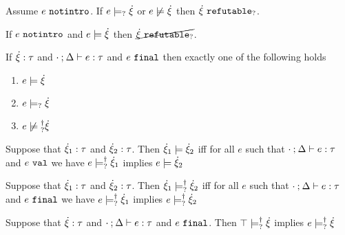 

\begin{lemma}
  \label{lem:notintro-maysat-or-notsat-refutable}
  Assume $e ~\mathtt{notintro}$. If $e \models_{?} \dot{\xi}$ or $\cnotsatisfy{e}{\hxi}$ then $\dot{\xi} ~\mathtt{refutable}_?$.
\end{lemma}

\begin{lemma}
\label{lem:satisfy-not-refutable}
If $e ~\mathtt{notintro}$ and $e \models \dot{\xi}$ then $\cancel{\dot{\xi} ~\mathtt{refutable}_?}$.
\end{lemma}

\begin{theorem}
  \label{thrm:exclusive-constraint-satisfaction}
  If $\dot{\xi} : \tau$ and $\cdot \mathbin{;} \Delta \vdash e : \tau$ and $e ~\mathtt{final}$ then exactly one of the following holds
  \begin{enumerate}
    \item $e \models \dot{\xi}$
    \item $e \models_{?} \dot{\xi}$
    \item $\cnotsatisfyormay{e}{\hxi}$
  \end{enumerate}
\end{theorem}

\begin{definition}
  \label{defn:const-entailment}
  Suppose that $\dot{\xi}_1 : \tau$ and $\dot{\xi}_2 : \tau$.
  Then $\dot{\xi}_1 \models \dot{\xi}_2$ iff for all $e$ such that $\cdot \mathbin{;} \Delta \vdash e : \tau$ and $e ~\mathtt{val}$ we have $e \models_{?}^{\dag} \dot{\xi}_1$ implies $e \models \dot{\xi}_2$
\end{definition}

\begin{definition}
  \label{defn:nn-entailment}
  Suppose that $\dot{\xi}_1 : \tau$ and $\dot{\xi}_2 : \tau$. Then $\dot{\xi}_1 \models_{?}^{\dag} \dot{\xi}_2$ iff for all $e$ such that $\cdot \mathbin{;} \Delta \vdash e : \tau$ and $e ~\mathtt{final}$ we have $e \models_{?}^{\dag} \dot{\xi}_1$ implies $e \models_{?}^{\dag} \dot{\xi}_2$ 
\end{definition}

\begin{corollary}
  \label{corol:nn-exhaust}
  Suppose that $\dot{\xi} : \tau$ and $\cdot \mathbin{;} \Delta \vdash e : \tau$ and $e ~\mathtt{final}$. Then $\top \models_{?}^{\dag} \dot{\xi}$ implies $e \models_{?}^{\dag} \dot{\xi}$
\end{corollary}

